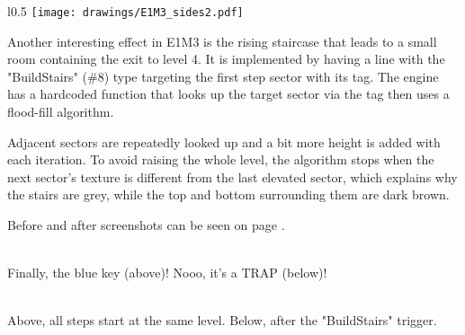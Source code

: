 \par
\begin{wrapfigure}[23]{l}{0.5\textwidth}
\centering
\texttt{[image: drawings/E1M3\_sides2.pdf]}
\end{wrapfigure}
Another interesting effect in E1M3 is the rising staircase that leads to a small room containing the exit to level 4. It is implemented by having a line with the "BuildStairs" (\#8) type targeting the first step sector with its tag. The engine has a hardcoded  function that looks up the target sector via the tag then uses a flood-fill algorithm.\\
\par Adjacent sectors are repeatedly looked up and a bit more height is added with each iteration. To avoid raising the whole level, the algorithm stops when the next sector's texture is different from the last elevated sector, which explains why the stairs are grey, while the top and bottom surrounding them are dark brown.\\
\par
Before and after screenshots can be seen on page \pageref{stairs}.


 \label{e1m3_trap} \\
Finally, the blue key (above)! Nooo, it's a TRAP (below)!

\vspace{2mm}
 \label{stairs} \\
Above, all steps start at the same level. Below, after the "BuildStairs" trigger. 

\vspace{2mm}



